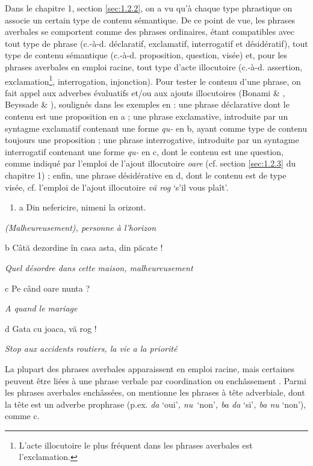 Dans le chapitre 1, section \ref{sec:1.2.2}, on a vu qu'à chaque type phrastique on associe un certain type de contenu sémantique. De ce point de vue, les phrases averbales se comportent comme des phrases ordinaires, étant compatibles avec tout type de phrase (c.-à-d. déclaratif, exclamatif, interrogatif et désidératif), tout type de contenu sémantique (c.-à-d. proposition, question, visée) et, pour les phrases averbales en emploi racine, tout type d'acte illocutoire (c.-à-d. assertion, exclamation\footnote{L'acte illocutoire le plus fréquent dans les phrases averbales est l'exclamation.}, interrogation, injonction). Pour tester le contenu d'une phrase, on fait appel aux adverbes évaluatifs et/ou aux ajouts illocutoires (Bonami \& \citet{Godard2005}, Beyssade \& \citet{Marandin2006}), soulignés dans les exemples en  : une phrase déclarative dont le contenu est une proposition en a ; une phrase exclamative, introduite par un syntagme exclamatif contenant une forme \textit{qu-} en b, ayant comme type de contenu toujours une proposition ; une phrase interrogative, introduite par un syntagme interrogatif contenant une forme \textit{qu-} en c, dont le contenu est une question, comme indiqué par l'emploi de l'ajout illocutoire \textit{oare} (cf. section \ref{sec:1.2.3} du chapitre 1) ; enfin, une phrase désidérative en d, dont le contenu est de type visée, cf. l'emploi de l'ajout illocutoire \textit{vă rog} `s'il vous plaît'. 


\begin{enumerate}
\item \label{bkm:Ref302653181}a  Din nefericire, nimeni la orizont.


\end{enumerate}
\textit{  (Malheureusement), personne à l'horizon}  

  b  Câtă dezordine în casa asta, din păcate !

    \textit{Quel désordre dans cette maison, malheureusement}  

  c  Pe când oare nunta ? 

{\itshape
A quand le mariage}

\textbf{ } d  Gata cu joaca, vă rog !

    \textit{Stop aux accidents routiers, la vie a la priorité}

La plupart des phrases averbales apparaissent en emploi racine, mais certaines peuvent être liées à une phrase verbale par coordination  ou enchâssement . Parmi les phrases averbales enchâssées, on mentionne les phrases à tête adverbiale, dont la tête est un adverbe prophrase (p.ex. \textit{da} `oui'\textit{, nu~}`non'\textit{, ba da} `si'\textit{, ba nu} `non'), comme c. 


